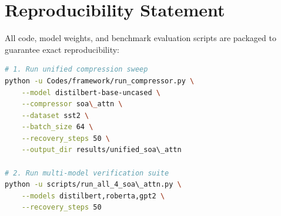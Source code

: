 \section{Reproducibility Statement}
All code, model weights, and benchmark evaluation scripts are packaged to guarantee exact reproducibility:
\begin{lstlisting}[language=bash]
# 1. Run unified compression sweep
python -u Codes/framework/run_compressor.py \
    --model distilbert-base-uncased \
    --compressor soa\_attn \
    --dataset sst2 \
    --batch_size 64 \
    --recovery_steps 50 \
    --output_dir results/unified_soa\_attn

# 2. Run multi-model verification suite
python -u scripts/run_all_4_soa\_attn.py \
    --models distilbert,roberta,gpt2 \
    --recovery_steps 50
\end{lstlisting}
